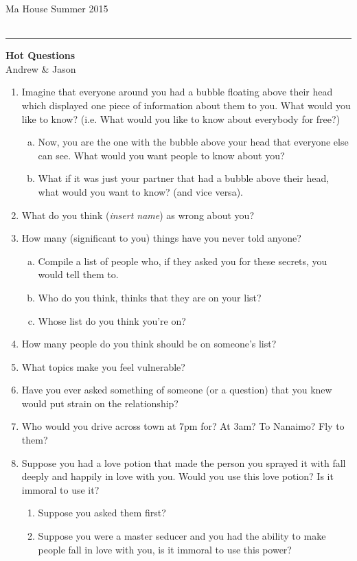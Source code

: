 \documentclass[11pt]{article}
\newcommand{\myheader}[4]{%
	\vspace*{-0.5in}
	\noindent
	{#1} \hfill {#3}\\
	{#2} \hfill {#4}\\
	\rule[8pt]{\textwidth}{1pt}
}
\newcommand{\mytitle}[2]{%
	\begin{center}
		{\large {\bf #1}}\\
		\bigskip
		#2\\ %
		\medskip
	\end{center}
}
\begin{document}
\myheader{Ma House}{}{Summer 2015}{}
\mytitle{Hot Questions}{Andrew \& Jason}

\begin{enumerate}
	\item Imagine that everyone around you had a bubble floating above their head which displayed one piece of information about
		them to you. What would you like to know? (i.e. What would you like to know about everybody for free?)
		\begin{enumerate}[(a)]
			\item Now, you are the one with the bubble above your head that everyone else can see. What would you want people to know
				about you?
			\item What if it was just your partner that had a bubble above their head, what would you want to know? (and vice versa).
		\end{enumerate}

	\item What do you think (\emph{insert name}) as wrong about you?

	\item How many (significant to you) things have you never told anyone?
		\begin{enumerate}[(a)]
			\item Compile a list of people who, if they asked you for these secrets, you would tell them to.
			\item Who do you think, thinks that they are on your list?
			\item Whose list do you think you're on?
		\end{enumerate}

	\item How many people do you think should be on someone's list? 
	\item What topics make you feel vulnerable?
	\item Have you ever asked something of someone (or a question) that you knew would put strain on the relationship?
	\item Who would you drive across town at 7pm for? At 3am? To Nanaimo? Fly to them?
	\item Suppose you had a love potion that made the person you sprayed it with fall deeply and happily in love with you.
		Would you use this love potion? Is it immoral to use it?
		\begin{enumerate}
			\item Suppose you asked them first?
			\item Suppose you were a master seducer and you had the ability to make people fall in love with you, is it 
				immoral to use this power?


\end{enumerate}
\end{enumerate}
\end{document}
